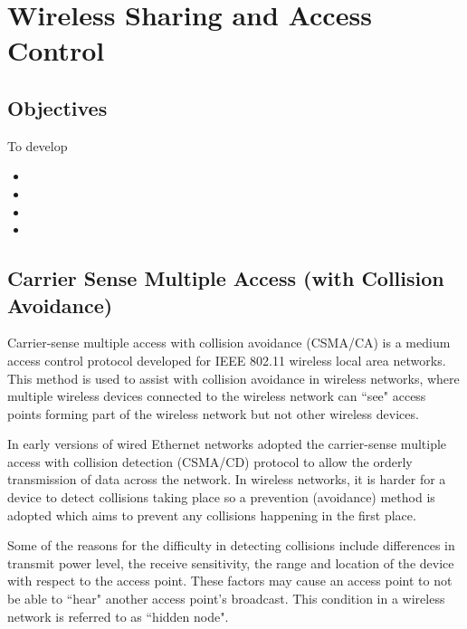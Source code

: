 \chapter{Wireless Sharing and Access Control}\label{waccess}

\minitoc 

\clearpage
\section*{Objectives}
To develop 
\begin{itemize}

\item 

\item 

\item 

\item 

\end{itemize}

\section{Carrier Sense Multiple Access (with Collision Avoidance)}\label{CSMA/CA}

Carrier-sense multiple access with collision avoidance (CSMA/CA) is a
medium access control protocol developed for IEEE 802.11 wireless local
area networks.  This method is used to assist with collision avoidance
in wireless networks, where multiple wireless devices connected to the
wireless network can ``see" access points forming part of the wireless
network but not other wireless devices.

In early versions of wired Ethernet networks adopted the carrier-sense
multiple access with collision detection (CSMA/CD) protocol to allow the
orderly transmission of data across the network. In wireless networks, it
is harder for a device to detect collisions taking place so a prevention
(avoidance) method is adopted which aims to prevent any collisions
happening in the first place.

Some of the reasons for the difficulty in detecting collisions include
differences in transmit power level, the receive sensitivity, the
range and location of the device with respect to the access point. These
factors may cause an access point to not be able to ``hear" another access
point's broadcast. This condition in a wireless network is referred to as
``hidden node".

